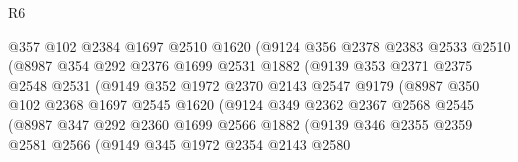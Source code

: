 \begin{lexlean}{R6}
\begin{coremodule}
                          @357
                          @102
                          @2384
                          @1697
                          @2510
                          @1620
                          (@9124
                            @356
                            @2378
                            @2383
                            @2533
                            @2510
                            (@8987
                              @354
                              @292
                              @2376
                              @1699
                              @2531
                              @1882
                              (@9139
                                @353
                                @2371
                                @2375
                                @2548
                                @2531
                                (@9149
                                  @352
                                  @1972
                                  @2370
                                  @2143
                                  @2547
                                  @9179
                                  (@8987
                                    @350
                                    @102
                                    @2368
                                    @1697
                                    @2545
                                    @1620
                                    (@9124
                                      @349
                                      @2362
                                      @2367
                                      @2568
                                      @2545
                                      (@8987
                                        @347
                                        @292
                                        @2360
                                        @1699
                                        @2566
                                        @1882
                                        (@9139
                                          @346
                                          @2355
                                          @2359
                                          @2581
                                          @2566
                                          (@9149
                                            @345
                                            @1972
                                            @2354
                                            @2143
                                            @2580

\end{coremodule}
\end{lexlean}
